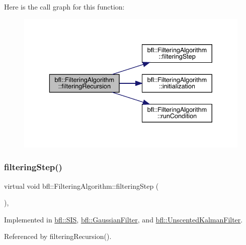 Here is the call graph for this function\+:
\nopagebreak
\begin{figure}[H]
\begin{center}
\leavevmode
\includegraphics[width=336pt]{classbfl_1_1FilteringAlgorithm_a139fe290f73939e72c88cb43c8ef7544_cgraph}
\end{center}
\end{figure}
\mbox{\label{classbfl_1_1FilteringAlgorithm_ab3bceb43b5810a4bf1da884b8a0b145a}} 
\subsubsection{\texorpdfstring{filtering\+Step()}{filteringStep()}}
{\footnotesize\ttfamily virtual void bfl\+::\+Filtering\+Algorithm\+::filtering\+Step (\begin{DoxyParamCaption}{ }\end{DoxyParamCaption})\hspace{0.3cm}{\ttfamily [protected]}, {}}



Implemented in \mbox{\hyperlink{classbfl_1_1SIS_a582f06cc5456d2cc6ed8f90087cbbb4c}{bfl\+::\+S\+IS}}, \mbox{\hyperlink{classbfl_1_1GaussianFilter_ae30a175454a93685eca79d3ef857f7bc}{bfl\+::\+Gaussian\+Filter}}, and \mbox{\hyperlink{classbfl_1_1UnscentedKalmanFilter_a169451bb711a03ad2dc28a40e3ad867f}{bfl\+::\+Unscented\+Kalman\+Filter}}.



Referenced by filtering\+Recursion().

\mbox{\label{classbfl_1_1Logger_a913a795b7bfbf378815eeb342d68a7c0}} 
